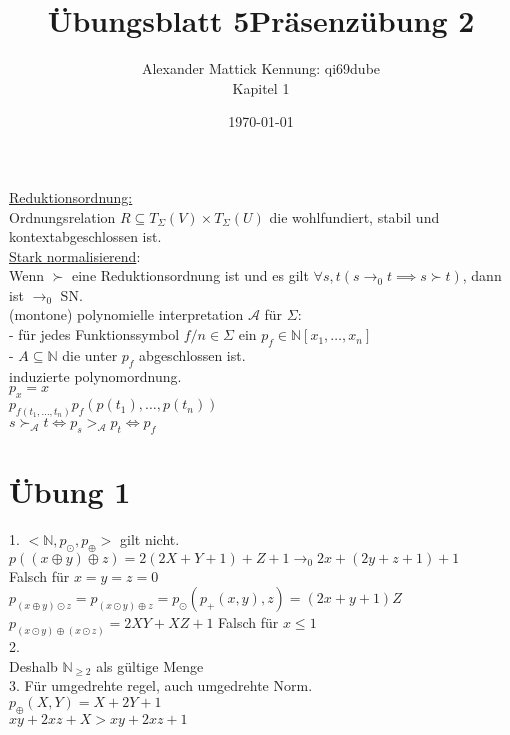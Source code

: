 \documentclass{article}
\title{Übungsblatt 5}
\author{
Alexander Mattick Kennung: qi69dube\\
Kapitel 1
}
\date{\today}
\title{Präsenzübung 2}
\begin{document}
	\maketitle\noindent
	\underline{Reduktionsordnung:}\\
	Ordnungsrelation $R\subseteq T_\Sigma(V)\times T_\Sigma(U)$ die wohlfundiert, stabil und kontextabgeschlossen ist.\\
	\underline{Stark normalisierend}:\\
	Wenn $\succ$ eine Reduktionsordnung ist und es gilt $\forall s,t(s\to_0 t\implies s\succ t)$, dann ist $\to_0$ SN.\\
	(montone) polynomielle interpretation $\mathscr{A}$ für $\Sigma$:\\
	- für jedes Funktionssymbol $f/n \in\Sigma$ ein $p_f\in\mathbb{N}[x_1,\dots,x_n]$\\
	- $A\subseteq \mathbb{N}$ die unter $p_f$ abgeschlossen ist.\\
	induzierte polynomordnung.\\
	$p_x = x$\\
	$p_{f(t_1,\dots,t_n)} p_f(p(t_1),\dots, p(t_n))$\\
	$s\succ_{\mathscr{A}} t \iff p_s >_{\mathscr{A}} p_t\iff p_f $\\
	\section{Übung 1}
	1. $<\mathbb{N}, p_\odot, p_\oplus>$ gilt nicht.\\
	$p((x\oplus y)\oplus z) = 2(2X+Y+1)+Z+1\to_0 2x+(2y+z+1)+1$\\
	Falsch für $x=y=z=0$\\
	$p_{(x\oplus y)\odot z} = p_{(x\odot y)\oplus z}= p_\odot(p_\plus(x,y), z) = (2x+y+1)Z$
	$p_{(x\odot y)\oplus (x\odot z)} = 2XY+XZ+1$ Falsch für $x\leq 1$\\
	2.\\
	Deshalb $\mathbb{N}_{\geq 2}$ als gültige Menge\\
	3. Für umgedrehte regel, auch umgedrehte Norm.\\
	$p_\oplus (X,Y) = X+2Y+1$\\
	$xy+2xz+X> xy+2xz+1$\\
\end{document}
